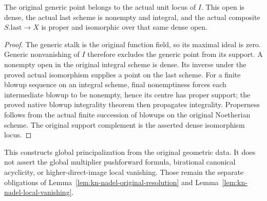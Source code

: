 \begin{lemma}\label{lem:kn-nadel-original-principalization-integral}
\leanok
{}
The original generic point belongs to the actual unit locus of $I$.
This open is dense, the actual last scheme is nonempty and integral,
and the actual composite $S.\mathrm{last}\to X$ is proper and isomorphic
over that same dense open.
\end{lemma}
\begin{proof}
The generic stalk is the original function field, so its maximal ideal
is zero.  Generic nonvanishing of $I$ therefore excludes the generic
point from its support.  A nonempty open in the original integral scheme
is dense.  Its inverse under the proved actual isomorphism supplies a
point on the last scheme.  For a finite blowup sequence on an integral
scheme, final nonemptiness forces each intermediate blowup to be
nonempty, hence its centre has proper support; the proved native blowup
integrality theorem then propagates integrality.  Properness follows
from the actual finite succession of blowups on the original Noetherian
scheme.  The original support complement is the asserted dense
isomorphism locus.
\end{proof}

This constructs global principalization from the original geometric data.
It does not assert the global multiplier pushforward formula, birational
canonical acyclicity, or higher-direct-image local vanishing.  Those remain
the separate obligations of Lemma~\ref{lem:kn-nadel-original-resolution}
and Lemma~\ref{lem:kn-nadel-local-vanishing}.
